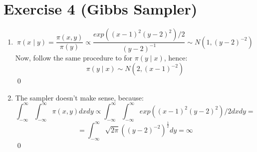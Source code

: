 \documentclass[12pt,letterpaper]{article}
\begin{document}
\newpage
\section*{Exercise 4 (Gibbs Sampler)}
\begin{enumerate}[leftmargin=!,labelindent=5pt]
\item 
$$
\pi(x \mid y) = \frac{\pi(x,y)}{\pi(y)} \propto
\frac{exp((x-1)^2(y-2)^2)/2}{(y-2)^{-1}} \sim N(1,(y-2)^{-2})
$$
Now, follow the same procedure to for $\pi(y \mid x)$, hence:
$$
\pi(y\mid x) \sim N(2, (x-1)^{-2})
$$
\qed

\item The sampler doesn't make sense, because:
$$
\int_{-\infty}^{\infty}
\int_{-\infty}^{\infty}
\pi(x,y)dxdy \propto
\int_{-\infty}^{\infty}
\int_{-\infty}^{\infty}
exp((x-1)^2(y-2)^2)/2 dx dy =
$$
$$ = 
\int_{-\infty}^{\infty}
\sqrt{2\pi}((y-2)^{-2})^{\frac{1}{2}}dy = \infty
$$
\qed

\end{enumerate}

\newpage
\end{document}
